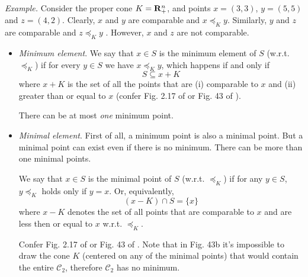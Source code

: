 \documentclass[a4paper, oneside]{book}
\begin{document}
\begin{itemize}
\textit{Example.} Consider the proper cone $K=\mathbf R^n_+$, and points $x=(3,3)$, $y=(5,5)$ and $z=(4,2)$. Clearly, $x$ and $y$ are comparable and $x\preceq_K y$. Similarly, $y$ and $z$ are comparable and $z \preceq_K y$ . However, $x$ and $z$ are not comparable.

	\begin{itemize}
	\item \textit{Minimum element}. We say that $x \in S$ is the minimum element of $S$ (w.r.t. $\preceq_K$) if for every $y \in S$ we have $x \preceq_K y$, which happens if and only if $$S \subseteq x+K$$
	where $x+K$ is the set of all the points that are (i) comparable to $x$ and (ii) greater than or equal to $x$ (confer Fig. 2.17 of \cite{boyd04} or Fig. 43 of \cite{dattorro10}).  
	
	There can be at most \textit{one} minimum point.
	\item \textit{Minimal element}. First of all, a minimum point is also a minimal point. But a minimal point can exist even if there is no minimum. There can be more than one minimal points. 
	
	We say that $x\in S$ is the minimal point of $S$ (w.r.t. $\preceq_K$) if for any $y\in S$, $y\preceq_K$ holds only if $y=x$. Or, equivalently, 
	$$ (x-K) \cap S = \{x\} $$
	where $x-K$ denotes the set of all points that are comparable to $x$ and are less then or equal to $x$ w.r.t. $\preceq_K$.
	
	Confer Fig. 2.17 of \cite{boyd04} or Fig. 43 of \cite{dattorro10}. Note that in Fig. 43b it's impossible to draw the cone $K$ (centered on any of the minimal points) that would contain the entire $\mathcal C_2$, therefore $\mathcal{C}_2$ has no minimum. 
	\end{itemize}
\end{itemize}
\end{document}
